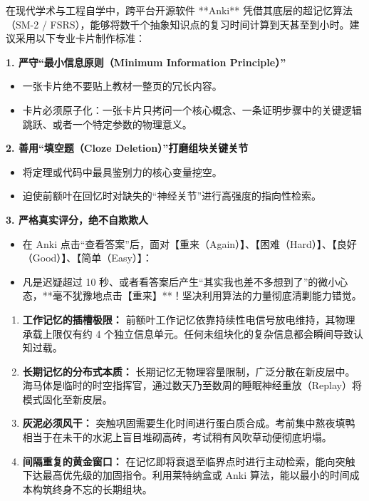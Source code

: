 \documentclass[12pt,a4paper,openany]{ctexbook}
\begin{document}
\begin{practicebox}
在现代学术与工程自学中，跨平台开源软件 **Anki** 凭借其底层的超记忆算法（SM-2 / FSRS），能够将数千个抽象知识点的复习时间计算到天甚至到小时。建议采用以下专业卡片制作标准：

\textbf{1. 严守“最小信息原则（Minimum Information Principle）”}
\begin{itemize}
    \item 一张卡片绝不要贴上教材一整页的冗长内容。
    \item 卡片必须原子化：一张卡片只拷问一个核心概念、一条证明步骤中的关键逻辑跳跃、或者一个特定参数的物理意义。
\end{itemize}

\textbf{2. 善用“填空题（Cloze Deletion）”打磨组块关键关节}
\begin{itemize}
    \item 将定理或代码中最具鉴别力的核心变量挖空。
    \item 迫使前额叶在回忆时对缺失的“神经关节”进行高强度的指向性检索。
\end{itemize}

\textbf{3. 严格真实评分，绝不自欺欺人}
\begin{itemize}
    \item 在 Anki 点击“查看答案”后，面对【重来（Again）】、【困难（Hard）】、【良好（Good）】、【简单（Easy）】：
    \item 凡是迟疑超过 10 秒、或者看答案后产生“其实我也差不多想到了”的微小心态，**毫不犹豫地点击【重来】**！坚决利用算法的力量彻底清剿能力错觉。
\end{itemize}
\end{practicebox}

\clearpage
\begin{summarybox}
\begin{enumerate}
    \item \textbf{工作记忆的插槽极限：} 前额叶工作记忆依靠持续性电信号放电维持，其物理承载上限仅有约 4 个独立信息单元。任何未组块化的复杂信息都会瞬间导致认知过载。
    \item \textbf{长期记忆的分布式本质：} 长期记忆无物理容量限制，广泛分散在新皮层中。海马体是临时的时空指挥官，通过数天乃至数周的睡眠神经重放（Replay）将模式固化至新皮层。
    \item \textbf{灰泥必须风干：} 突触巩固需要生化时间进行蛋白质合成。考前集中熬夜填鸭相当于在未干的水泥上盲目堆砌高砖，考试稍有风吹草动便彻底坍塌。
    \item \textbf{间隔重复的黄金窗口：} 在记忆即将衰退至临界点时进行主动检索，能向突触下达最高优先级的加固指令。利用莱特纳盒或 Anki 算法，能以最小的时间成本构筑终身不忘的长期组块。
\end{enumerate}
\end{summarybox}
\end{document}
